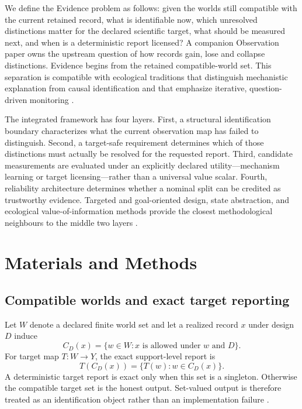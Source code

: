 \documentclass[11pt]{article}
\begin{document}
We define the Evidence problem as follows: given the worlds still compatible with the current retained record, what is identifiable now, which unresolved distinctions matter for the declared scientific target, what should be measured next, and when is a deterministic report licensed? A companion Observation paper owns the upstream question of how records gain, lose and collapse distinctions. Evidence begins from the retained compatible-world set. This separation is compatible with ecological traditions that distinguish mechanistic explanation from causal identification and that emphasize iterative, question-driven monitoring \cite{GraceEtAl2025,CorreiaEtAl2025,SiegelDee2025,NicholsWilliams2006,LindenmayerLikens2009,Dietze2017}.

The integrated framework has four layers. First, a structural identification boundary characterizes what the current observation map has failed to distinguish. Second, a target-safe requirement determines which of those distinctions must actually be resolved for the requested report. Third, candidate measurements are evaluated under an explicitly declared utility---mechanism learning or target licensing---rather than a universal value scalar. Fourth, reliability architecture determines whether a nominal split can be credited as trustworthy evidence. Targeted and goal-oriented design, state abstraction, and ecological value-of-information methods provide the closest methodological neighbours to the middle two layers \cite{GivanDeanGreig2003,VanlierEtAl2012,AttiaEtAl2018,ZhongEtAl2026,CanessaEtAl2015}.

\section{Materials and Methods}
\subsection{Compatible worlds and exact target reporting}
Let $W$ denote a declared finite world set and let a realized record $x$ under design $D$ induce
\[
C_D(x)=\{w\in W:x\text{ is allowed under }w\text{ and }D\}.
\]
For target map $T:W\to Y$, the exact support-level report is
\[
T(C_D(x))=\{T(w):w\in C_D(x)\}.
\]
A deterministic target report is exact only when this set is a singleton. Otherwise the compatible target set is the honest output. Set-valued output is therefore treated as an identification object rather than an implementation failure \cite{Manski2003}.
\end{document}
